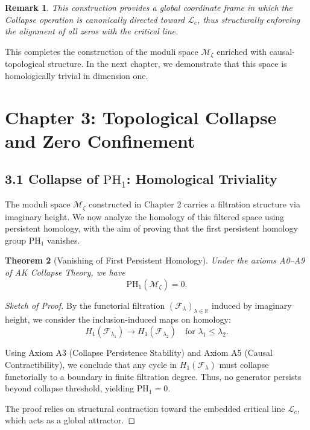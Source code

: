 \documentclass[11pt]{article}
\newtheorem{theorem}{Theorem}[section]
\newtheorem{remark}[theorem]{Remark}
\begin{document}
\begin{remark}
This construction provides a global coordinate frame in which the Collapse operation is canonically directed toward $\mathcal{L}_c$,  
thus structurally enforcing the alignment of all zeros with the critical line.
\end{remark}

This completes the construction of the moduli space $\mathcal{M}_\zeta$ enriched with causal-topological structure.  
In the next chapter, we demonstrate that this space is homologically trivial in dimension one.



\section{Chapter 3: Topological Collapse and Zero Confinement}

\subsection{3.1 Collapse of $\mathrm{PH}_1$: Homological Triviality}

The moduli space $\mathcal{M}_\zeta$ constructed in Chapter 2 carries a filtration structure via imaginary height.  
We now analyze the homology of this filtered space using persistent homology, with the aim of proving that the first persistent homology group $\mathrm{PH}_1$ vanishes.

\begin{theorem}[Vanishing of First Persistent Homology]
Under the axioms A0–A9 of AK Collapse Theory, we have
\[
\mathrm{PH}_1(\mathcal{M}_\zeta) = 0.
\]
\end{theorem}

\begin{proof}[Sketch of Proof]
By the functorial filtration $(\mathcal{F}_\lambda)_{\lambda \in \mathbb{R}}$ induced by imaginary height,  
we consider the inclusion-induced maps on homology:
\[
H_1(\mathcal{F}_{\lambda_1}) \rightarrow H_1(\mathcal{F}_{\lambda_2}) \quad \text{for } \lambda_1 \leq \lambda_2.
\]

Using Axiom A3 (Collapse Persistence Stability) and Axiom A5 (Causal Contractibility), we conclude that any cycle in $H_1(\mathcal{F}_\lambda)$  
must collapse functorially to a boundary in finite filtration degree. Thus, no generator persists beyond collapse threshold, yielding $\mathrm{PH}_1 = 0$.

The proof relies on structural contraction toward the embedded critical line $\mathcal{L}_c$, which acts as a global attractor.
\end{proof}
\end{document}
